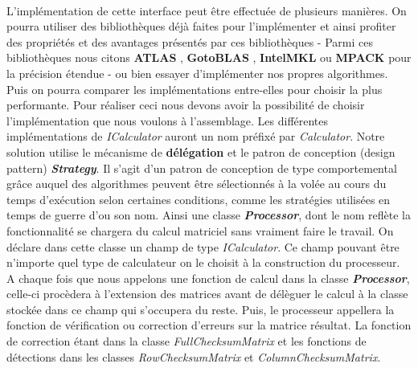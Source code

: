 \documentclass[a4paper, 10pt]{report}
\begin{document}
\paragraph*{}
L’implémentation de cette interface peut être effectuée de plusieurs manières. On pourra utiliser 
des bibliothèques déjà faites pour l’implémenter et ainsi profiter des propriétés et des avantages présentés 
par ces bibliothèques - Parmi ces bibliothèques nous citons \textbf{ATLAS} \cite{ATLAS}, \textbf{GotoBLAS} \cite{GotoBLAS}, \textbf{IntelMKL} \cite{IntelMKL}
ou \textbf{MPACK} \cite{MPACK} pour la précision étendue - 
ou bien essayer d’implémenter nos propres algorithmes. Puis on pourra comparer les implémentations entre-elles pour choisir 
la plus performante. Pour réaliser ceci nous devons avoir la possibilité de choisir l’implémentation que nous 
voulons à l’assemblage. Les différentes implémentations de \textit{ICalculator} auront un nom préfixé par \textit{Calculator}. 
Notre solution utilise le mécanisme de \textbf{délégation} et le patron de conception (design pattern) \textbf{\textit{Strategy}}. 
Il s’agit d’un patron de conception de type comportemental grâce auquel des algorithmes peuvent être sélectionnés à la 
volée au cours du temps d'exécution selon certaines conditions, comme les stratégies utilisées en temps de guerre d’ou son nom.
\newline
Ainsi une classe \textbf{\textit{Processor}}, dont le nom reflète la fonctionnalité se chargera du calcul matriciel sans vraiment faire 
le travail. On déclare dans cette classe un champ de type \textit{ICalculator}. Ce champ pouvant être n’importe quel 
type de calculateur on le choisit à la construction du processeur. A chaque fois que nous appelons une fonction de calcul 
dans la classe \textbf{\textit{Processor}}, celle-ci procèdera à l'extension des matrices avant de délèguer le calcul à la 
classe stockée dans ce champ qui s’occupera du reste. Puis, le processeur appellera la fonction de vérification ou 
correction d’erreurs sur la matrice résultat. La fonction de correction étant dans la classe \textit{FullChecksumMatrix} et
les fonctions de détections dans les classes \textit{RowChecksumMatrix} et \textit{ColumnChecksumMatrix}.
\end{document}
